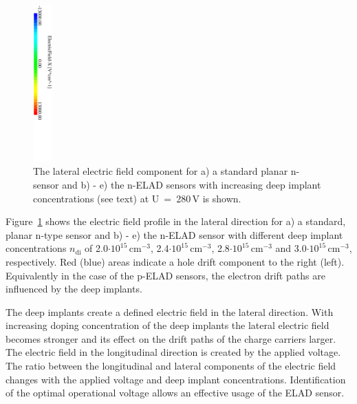 \documentclass[a4paper,11pt]{article}
\begin{document}
\begin{figure}[b!]
  \includegraphics[trim=-40 120 0 0, height=6cm]{figures/elfleg.pdf}
  \caption{
The lateral electric field component for a) a standard planar n-sensor and b) - e) the n-ELAD sensors with increasing deep implant concentrations (see text) at U~=~280\,V is shown.
}
  \label{fig:ef}
\end{figure}

Figure~\ref{fig:ef} shows the electric field profile in the lateral direction for a) a standard, planar n-type sensor
 and b) - e) the n-ELAD sensor with different deep implant concentrations
  $n\mathrm{_{di}}$ of 2.0$\mathrm{\cdot10^{15}\,cm^{-3}}$, 2.4$\mathrm{\cdot10^{15}\,cm^{-3}}$, 2.8$\mathrm{\cdot10^{15}\,cm^{-3}}$ and 3.0$\mathrm{\cdot10^{15}\,cm^{-3}}$, respectively.
Red (blue) areas indicate a hole drift component to the right (left).
Equivalently in the case of the p-ELAD sensors, the electron drift paths are influenced by the deep implants.

The deep implants create a defined electric field in the lateral direction. 
With increasing doping concentration of the deep implants the lateral electric field becomes stronger and its effect on the drift paths of the charge carriers larger.
The electric field in the longitudinal direction is created by the applied voltage. 
The ratio between the longitudinal and lateral components of the electric field changes with the applied voltage and deep implant concentrations.
Identification of the optimal operational voltage allows an effective usage of the ELAD sensor.
\end{document}

